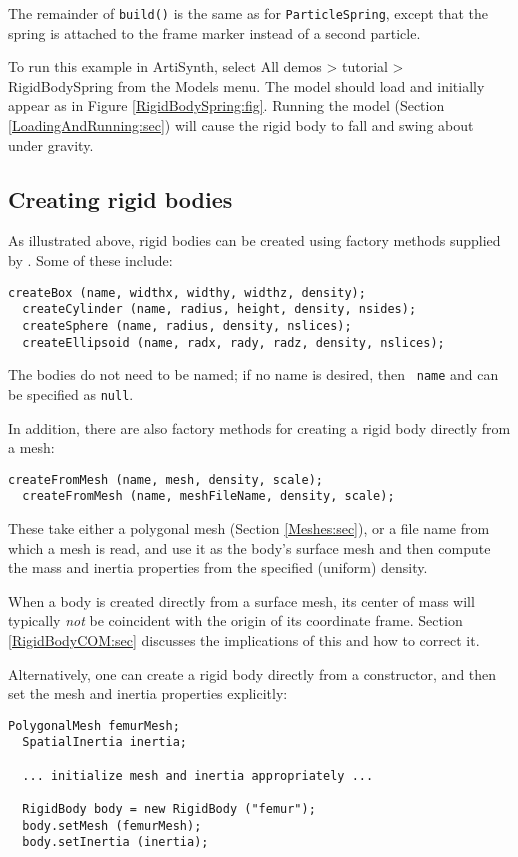 The remainder of {\tt build()} is the same as for {\tt ParticleSpring},
except that the spring is attached to the frame marker instead of a
second particle.

To run this example in ArtiSynth, select {\sf All demos > tutorial >
RigidBodySpring} from the {\sf Models} menu. The model should load and
initially appear as in Figure \ref{RigidBodySpring:fig}.  Running the
model (Section \ref{LoadingAndRunning:sec}) will cause the rigid body
to fall and swing about under gravity.

\subsection{Creating rigid bodies}

As illustrated above, rigid bodies can be created using factory
methods supplied by .
Some of these include:
\begin{lstlisting}[]
  createBox (name, widthx, widthy, widthz, density);
  createCylinder (name, radius, height, density, nsides);
  createSphere (name, radius, density, nslices);
  createEllipsoid (name, radx, rady, radz, density, nslices);
\end{lstlisting}
%
The bodies do not need to be named; if no name is desired, then {\tt
name} and can be specified as {\tt null}.

In addition, there are also
factory methods for creating a rigid body directly from a mesh:
\begin{lstlisting}[]
  createFromMesh (name, mesh, density, scale);
  createFromMesh (name, meshFileName, density, scale);
\end{lstlisting}
%
These take either a polygonal mesh (Section \ref{Meshes:sec}), or a
file name from which a mesh is read, and use it as the body's surface
mesh and then compute the mass and inertia properties from the specified
(uniform) density.

\begin{sideblock}
When a body is created directly from a surface mesh, its center of
mass will typically {\it not} be coincident with the origin of its
coordinate frame. Section \ref{RigidBodyCOM:sec} discusses the
implications of this and how to correct it.
\end{sideblock}

Alternatively, one can create a rigid body directly from a
constructor, and then set the mesh and inertia properties explicitly:
%
\begin{lstlisting}[]
  PolygonalMesh femurMesh;
  SpatialInertia inertia;

  ... initialize mesh and inertia appropriately ...

  RigidBody body = new RigidBody ("femur");
  body.setMesh (femurMesh);
  body.setInertia (inertia);
\end{lstlisting}
%

